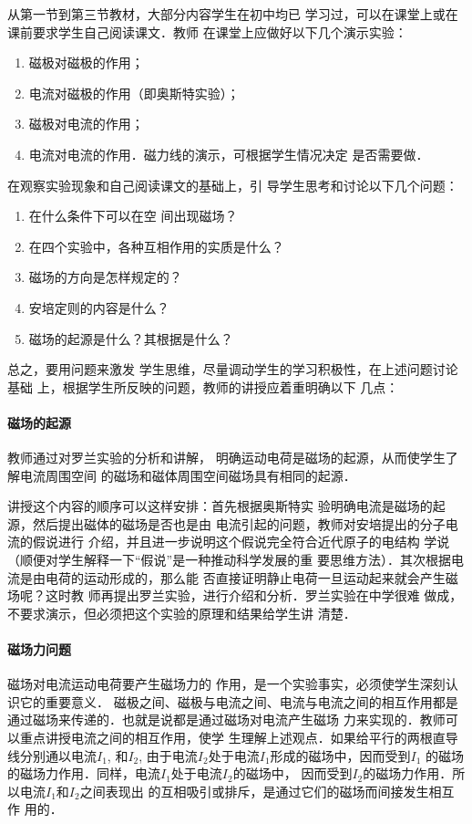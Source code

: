 从第一节到第三节教材，大部分内容学生在初中均已
学习过，可以在课堂上或在课前要求学生自己阅读课文．教师
在课堂上应做好以下几个演示实验：
\begin{enumerate}
\item 磁极对磁极的作用；
\item 电流对磁极的作用（即奥斯特实验）；    \item 磁极对电流的作用；
\item 电流对电流的作用．磁力线的演示，可根据学生情况决定
是否需要做．
\end{enumerate}
在观察实验现象和自己阅读课文的基础上，引
导学生思考和讨论以下几个问题：
\begin{enumerate}
\item 在什么条件下可以在空
间出现磁场？    \item 在四个实验中，各种互相作用的实质是什么？
\item 磁场的方向是怎样规定的？    \item 安培定则的内容是什么？   
 \item 
磁场的起源是什么？其根据是什么？
\end{enumerate}
总之，要用问题来激发
学生思维，尽量调动学生的学习积极性，在上述问题讨论基础
上，根据学生所反映的问题，教师的讲授应着重明确以下
几点：

\paragraph{磁场的起源}
教师通过对罗兰实验的分析和讲解，
明确运动电荷是磁场的起源，从而使学生了解电流周围空间
的磁场和磁体周围空间磁场具有相同的起源．

讲授这个内容的顺序可以这样安排：首先根据奥斯特实
验明确电流是磁场的起源，然后提出磁体的磁场是否也是由
电流引起的问题，教师对安培提出的分子电流的假说进行
介绍，并且进一步说明这个假说完全符合近代原子的电结构
学说（顺便对学生解释一下“假说”是一种推动科学发展的重
要思维方法）．其次根据电流是由电荷的运动形成的，那么能
否直接证明静止电荷一旦运动起来就会产生磁场呢？这时教
师再提出罗兰实验，进行介绍和分析．罗兰实验在中学很难
做成，不要求演示，但必须把这个实验的原理和结果给学生讲
清楚．

\paragraph{磁场力问题}
磁场对电流运动电荷要产生磁场力的
作用，是一个实验事实，必须使学生深刻认识它的重要意义．
磁极之间、磁极与电流之间、电流与电流之间的相互作用都是
通过磁场来传递的．也就是说都是通过磁场对电流产生磁场
力来实现的．教师可以重点讲授电流之间的相互作用，使学
生理解上述观点．如果给平行的两根直导线分别通以电流$I_1$,
和$I_2$, 由于电流$I_2$处于电流$I_1$形成的磁场中，因而受到$I_1$
的磁场的磁场力作用．同样，电流$I_1$处于电流$I_2$的磁场中，
因而受到$I_2$的磁场力作用．所以电流$I_1$和$I_2$之间表现出
的互相吸引或排斥，是通过它们的磁场而间接发生相互作
用的．

